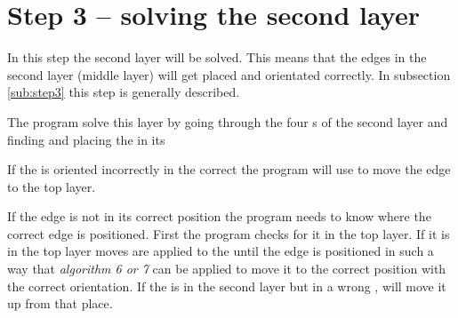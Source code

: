 \section{Step 3 -- solving the second layer}
In this step the second layer will be solved. 
This means that the edges in the second layer (middle layer) will get placed and orientated correctly. 
In subsection \ref{sub:step3} this step is generally described. 

The program solve this layer by going through the four \cubicle{}s of the second layer and finding and placing the \cpiece{} in its \cubicle{}

If the \cpiece is oriented incorrectly in the correct \cubicle{} the program will use   to move the edge \cpiece{} to the top layer.

If the edge \cpiece{} is not in its correct position the program needs to know where the correct edge \cpiece{} is positioned. First the program checks for it in the top layer. 
If it is in the top layer  moves are applied to the \rubik{} until the edge \cpiece{} is positioned in such a way that \textit{algorithm 6 or 7} can be applied to move it to the correct position with the correct orientation. 
If the \cpiece{} is in the second layer but in a wrong \cubicle{},  will move it up from that place. 
